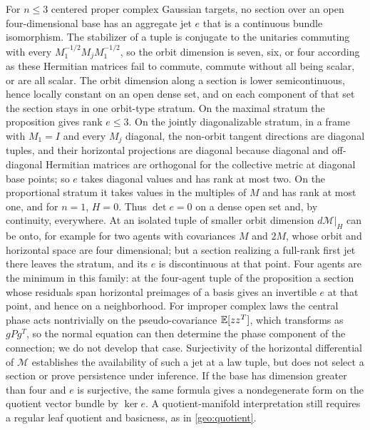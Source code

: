 For $n\le3$ centered proper complex Gaussian targets, no section over an open four-dimensional base has an aggregate jet $e$ that is a continuous bundle isomorphism. The stabilizer of a tuple is conjugate to the unitaries commuting with every $M_1^{-1/2}M_jM_1^{-1/2}$, so the orbit dimension is seven, six, or four according as these Hermitian matrices fail to commute, commute without all being scalar, or are all scalar. The orbit dimension along a section is lower semicontinuous, hence locally constant on an open dense set, and on each component of that set the section stays in one orbit-type stratum. On the maximal stratum the proposition gives rank $e\le3$. On the jointly diagonalizable stratum, in a frame with $M_1=I$ and every $M_j$ diagonal, the non-orbit tangent directions are diagonal tuples, and their horizontal projections are diagonal because diagonal and off-diagonal Hermitian matrices are orthogonal for the collective metric at diagonal base points; so $e$ takes diagonal values and has rank at most two. On the proportional stratum it takes values in the multiples of $M$ and has rank at most one, and for $n=1$, $H=0$. Thus $\det e=0$ on a dense open set and, by continuity, everywhere. At an isolated tuple of smaller orbit dimension $d\mathcal M|_H$ can be onto, for example for two agents with covariances $M$ and $2M$, whose orbit and horizontal space are four dimensional; but a section realizing a full-rank first jet there leaves the stratum, and its $e$ is discontinuous at that point. Four agents are the minimum in this family: at the four-agent tuple of the proposition a section whose residuals span horizontal preimages of a basis gives an invertible $e$ at that point, and hence on a neighborhood. For improper complex laws the central phase acts nontrivially on the pseudo-covariance $\mathbb E[zz^T]$, which transforms as $gPg^T$, so the normal equation can then determine the phase component of the connection; we do not develop that case. Surjectivity of the horizontal differential of $\mathcal M$ establishes the availability of such a jet at a law tuple, but does not select a section or prove persistence under inference. If the base has dimension greater than four and $e$ is surjective, the same formula gives a nondegenerate form on the quotient vector bundle by $\ker e$. A quotient-manifold interpretation still requires a regular leaf quotient and basicness, as in \cref{geo:quotient}.

